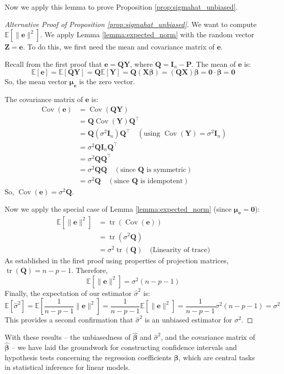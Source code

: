\documentclass[11pt, letterpaper]{article}
\theoremstyle{definition}
\theoremstyle{plain} %
\theoremstyle{remark}
\newcommand{\E}{\mathbb{E}}            %
\newcommand{\Cov}{\operatorname{Cov}}  %
\newcommand{\tr}{\operatorname{tr}}    %
\newcommand{\vb}[1]{\bm{#1}}          %
\newcommand{\mb}[1]{\bm{#1}}          %
\newcommand{\Yvec}{\vb{Y}}            %
\newcommand{\Xmat}{\mb{X}}            %
\newcommand{\Qmat}{\mb{Q}}            %
\newcommand{\Pmat}{\mb{P}}            %
\newcommand{\Imat}{\mb{I}}            %
\newcommand{\betavec}{\vb{\beta}}     %
\newcommand{\evec}{\vb{e}}            %
\newcommand{\betahatvec}{\vb{\hat{\beta}}}%
\newcommand{\muvec}{\vb{\mu}}        %
\newcommand{\zerovec}{\vb{0}}        %
\newcommand{\Zvec}{\vb{Z}}            %
\begin{document}
Now we apply this lemma to prove Proposition \ref{prop:sigmahat_unbiased}.

\begin{proof}[Alternative Proof of Proposition \ref{prop:sigmahat_unbiased}]
We want to compute $\E[\|\evec\|^2]$. We apply Lemma \ref{lemma:expected_norm} with the random vector $\Zvec = \evec$. To do this, we first need the mean and covariance matrix of $\evec$.

Recall from the first proof that $\evec = \Qmat\Yvec$, where $\Qmat = \Imat_n - \Pmat$.
The mean of $\evec$ is:
\[
\E[\evec] = \E[\Qmat\Yvec] = \Qmat \E[\Yvec] = \Qmat (\Xmat\betavec) = (\Qmat\Xmat)\betavec = \mb{0} \cdot \betavec = \zerovec
\]
So, the mean vector $\muvec_{\evec}$ is the zero vector.

The covariance matrix of $\evec$ is:
\begin{align*}
\Cov(\evec) &= \Cov(\Qmat\Yvec) \\
&= \Qmat \Cov(\Yvec) \Qmat^\top \\
&= \Qmat (\sigma^2 \Imat_n) \Qmat^\top \quad (\text{using } \Cov(\Yvec) = \sigma^2 \Imat_n) \\
&= \sigma^2 \Qmat \Imat_n \Qmat^\top \\
&= \sigma^2 \Qmat \Qmat^\top \\
&= \sigma^2 \Qmat \Qmat \quad (\text{since } \Qmat \text{ is symmetric}) \\
&= \sigma^2 \Qmat \quad (\text{since } \Qmat \text{ is idempotent})
\end{align*}
So, $\Cov(\evec) = \sigma^2 \Qmat$.

Now we apply the special case of Lemma \ref{lemma:expected_norm} (since $\muvec_{\evec} = \zerovec$):
\begin{align*}
\E[\|\evec\|^2] &= \tr(\Cov(\evec)) \\
&= \tr(\sigma^2 \Qmat) \\
&= \sigma^2 \tr(\Qmat) \quad \text{(Linearity of trace)}
\end{align*}
As established in the first proof using properties of projection matrices, $\tr(\Qmat) = n - p - 1$.
Therefore,
\[
\E[\|\evec\|^2] = \sigma^2 (n - p - 1)
\]
Finally, the expectation of our estimator $\hat{\sigma}^2$ is:
\[
\E[\hat{\sigma}^2] = \E\left[\frac{1}{n-p-1} \|\evec\|^2\right] = \frac{1}{n-p-1} \E[\|\evec\|^2] = \frac{1}{n-p-1} \sigma^2 (n - p - 1) = \sigma^2
\]
This provides a second confirmation that $\hat{\sigma}^2$ is an unbiased estimator for $\sigma^2$.
\end{proof}

With these results – the unbiasedness of $\betahatvec$ and $\hat{\sigma}^2$, and the covariance matrix of $\betahatvec$ – we have laid the groundwork for constructing confidence intervals and hypothesis tests concerning the regression coefficients $\betavec$, which are central tasks in statistical inference for linear models.
\end{document}
